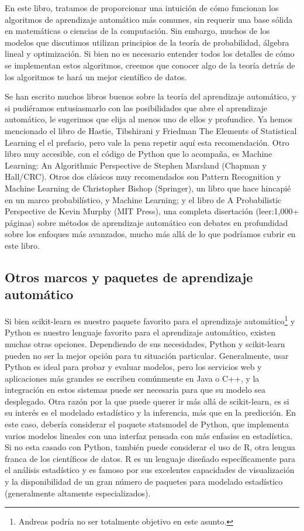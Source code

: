 En este libro, tratamos de proporcionar una intuición de cómo funcionan los algoritmos de aprendizaje automático más comunes, sin requerir una base sólida en matemáticas o ciencias de la computación. Sin embargo, muchos de los modelos que discutimos utilizan principios de la teoría de probabilidad, álgebra lineal y optimización. Si bien no es necesario entender todos los detalles de cómo se implementan estos algoritmos, creemos que conocer algo de la teoría detrás de los algoritmos te hará un mejor científico de datos.


Se han escrito muchos libros buenos sobre la teoría del aprendizaje automático,
y si pudiéramos entusiasmarlo con las posibilidades que abre el aprendizaje automático,
 le sugerimos que elija al menos uno de ellos y profundice. 
 Ya  hemos mencionado el libro de Hastie, Tibshirani y Friedman The Elements of Statistical Learning el el 
prefacio, pero vale la pena repetir aquí esta recomendación. 
Otro libro muy  accesible, con el código de Python que lo acompaña, es Machine Learning: An Algorithmic Perspective de Stephen Marsland (Chapman y Hall{\scriptsize/}CRC). 
Otros dos clásicos muy recomendados son Pattern Recognition y Machine Learning de Christopher Bishop (Springer), un libro que hace hincapié en un marco probabilístico, y Machine Learning; y el libro de   A Probabilistic Perspective de Kevin Murphy (MIT Press), una completa  disertación (leer:1,000{\scriptsize+} páginas) sobre métodos de aprendizaje automático con debates en profundidad sobre los enfoques más avanzados, mucho más allá de lo que podríamos cubrir en este libro.


\subsection{Otros marcos y paquetes de aprendizaje automático}


Si bien   {\ttfamily scikit-learn}  es nuestro paquete favorito para el aprendizaje automático{\footnote{Andreas podría no ser totalmente objetivo en este asunto.}} y Python es nuestro
lenguaje favorito para el aprendizaje automático, existen muchas otras opciones.
Dependiendo de sus necesidades, Python y {\ttfamily scikit-learn}  pueden no ser la mejor opción para
tu situación particular. 
Generalmente, usar Python es ideal para probar y evaluar modelos, pero los servicios web y aplicaciones más grandes se escriben  comúnmente en Java  o  C{\scriptsize++}, y  la integración en estos sistemas puede ser necesaria para que su modelo sea desplegado.
Otra razón por la que puede querer ir más allá de {\ttfamily scikit-learn},   es si  su interés es el modelado estadístico y la inferencia,  más  que en la predicción. 
En este caso, debería considerar el paquete {\ttfamily statsmodel } de Python, que implementa varios modelos lineales con una interfaz pensada con  más enfasiss en estadística.  
Si no esta casado con Python, también puede considerar el uso de R, otra lengua franca de los científicos de datos. R es un lenguaje diseñado específicamente para el análisis estadístico y es famoso por sus excelentes capacidades de visualización y la disponibilidad de un gran número  de paquetes para modelado estadístico (generalmente altamente especializados).\\


